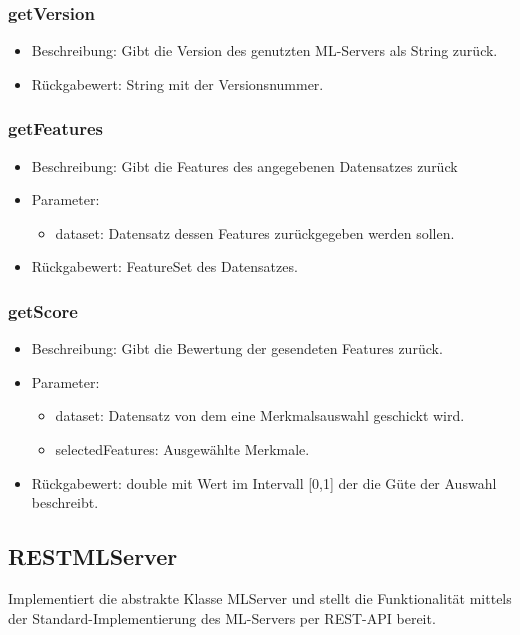 \documentclass[a4paper]{scrreprt}
\begin{document}
    \subsubsection{getVersion}
    \begin{itemize}
        \item Beschreibung: Gibt die Version des genutzten ML-Servers als String zurück.
        \item Rückgabewert: String mit der Versionsnummer.
    \end{itemize}

    \subsubsection{getFeatures}
    \begin{itemize}
        \item Beschreibung: Gibt die Features des angegebenen Datensatzes zurück
        \item Parameter:
        \begin{itemize}
            \item dataset: Datensatz dessen Features zurückgegeben werden sollen.
        \end{itemize}
        \item Rückgabewert: FeatureSet des Datensatzes.
    \end{itemize}

    \subsubsection{getScore}
    \begin{itemize}
        \item Beschreibung: Gibt die Bewertung der gesendeten Features zurück.
        \item Parameter:
        \begin{itemize}
            \item dataset: Datensatz von dem eine Merkmalsauswahl geschickt wird.
            \item selectedFeatures: Ausgewählte Merkmale.
        \end{itemize}
        \item Rückgabewert: double mit Wert im Intervall [0,1] der die Güte der Auswahl beschreibt.
    \end{itemize}

    \subsection{RESTMLServer}
    Implementiert die abstrakte Klasse MLServer und stellt die Funktionalität mittels der Standard-Implementierung des ML-Servers per REST-API bereit.
\end{document}
